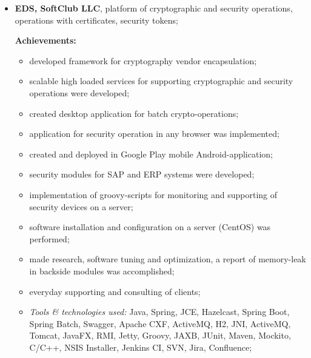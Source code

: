 \documentclass[a4paper, 12pt]{article}
\newcommand{\position}[1]{
    \textbf{#1}}
\newcommand{\itemlabel}[1]{
    \textit{#1:}}
\begin{document}
    \begin{itemize}
        \item \position{EDS, SoftClub LLC}, platform of cryptographic and security operations, operations with certificates, security tokens;

            \textbf{Achievements:}
			\begin{itemize}
  				\item developed framework for cryptography vendor encapsulation;
  				\item scalable high loaded services for supporting cryptographic and security operations were developed;
				\item created desktop application for batch crypto-operations;
  				\item application for security operation in any browser was implemented;
  				\item created and deployed in Google Play mobile Android-application;
  				\item security modules for SAP and ERP systems were developed;
  				\item implementation of groovy-scripts for monitoring and supporting of security devices on a server;
  				\item software installation and configuration on a server (CentOS) was performed;
  				\item made research, software tuning and optimization, a report of memory-leak in backside modules was accomplished;
  				\item everyday supporting and consulting of clients;
			\end{itemize}
	
            \begin{itemize}
                \item \itemlabel{Tools \& technologies used} Java, Spring, JCE, Hazelcast, Spring Boot, Spring Batch, Swagger, Apache CXF, ActiveMQ, H2, JNI, ActiveMQ, Tomcat, JavaFX, RMI, Jetty, Groovy, JAXB, JUnit, Maven, Mockito, C/C++, NSIS Installer, Jenkins CI, SVN, Jira, Confluence;
            \end{itemize}
    \end{itemize} 
            
\end{document}
